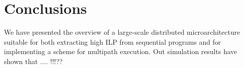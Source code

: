 \documentclass[10pt,dvips]{article}
\begin{document}



%
\section{Conclusions}
%
We have presented the overview of a large-scale distributed 
microarchitecture suitable for both extracting high ILP from
sequential programs and for implementing a scheme for
multipath execution.
Out simulation results have shown that .... !!!??




\end{document}

